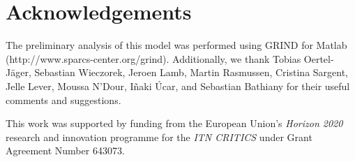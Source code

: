 \section{Acknowledgements}
\label{sec:Acknowledgements}
The preliminary analysis of this model was performed using GRIND for Matlab (http://www.sparcs-center.org/grind). Additionally, we thank Tobias Oertel-Jäger, Sebastian Wieczorek, Jeroen Lamb, Martin Rasmussen, Cristina Sargent, Jelle Lever, Moussa N'Dour, Iñaki Úcar, and Sebastian Bathiany for their useful comments and suggestions. 

This work was supported by funding from the European Union's \textit{Horizon 2020} research and innovation programme for the \textit{ITN CRITICS} under Grant Agreement Number 643073.
